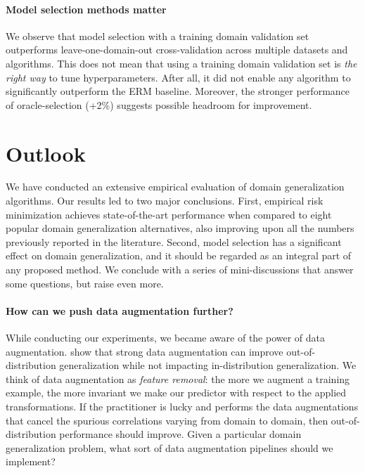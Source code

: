 \documentclass{article}
\begin{document}
\paragraph{Model selection methods matter}
%
We observe that model selection with a training domain validation set outperforms leave-one-domain-out cross-validation across multiple datasets and algorithms.
%
This does not mean that using a training domain validation set is \emph{the right way} to tune hyperparameters.
%
After all, it did not enable any algorithm to significantly outperform the ERM baseline.
%
Moreover, the stronger performance of oracle-selection (+2\%) suggests possible headroom for improvement. 

\section{Outlook}
\label{sec:outlook}

We have conducted an extensive empirical evaluation of domain generalization algorithms.
%
Our results led to two major conclusions.
%
First, empirical risk minimization achieves state-of-the-art performance when compared to eight popular domain generalization alternatives, also improving upon all the numbers previously reported in the literature.
%
Second, model selection has a significant effect on domain generalization, and it should be regarded as an integral part of any proposed method.
%
We conclude with a series of mini-discussions that answer some questions, but raise even more.

\paragraph{How can we push data augmentation further?}
%
While conducting our experiments, we became aware of the power of data augmentation.
%
\citet{zhang2019unseen} show that strong data augmentation can improve out-of-distribution generalization while not impacting in-distribution generalization.
%
We think of data augmentation as \emph{feature removal}: the more we augment a training example, the more invariant we make our predictor with respect to the applied transformations.
%
If the practitioner is lucky and performs the data augmentations that cancel the spurious correlations varying from domain to domain, then out-of-distribution performance should improve.
%
Given a particular domain generalization problem, what sort of data augmentation pipelines should we implement?
\end{document}
